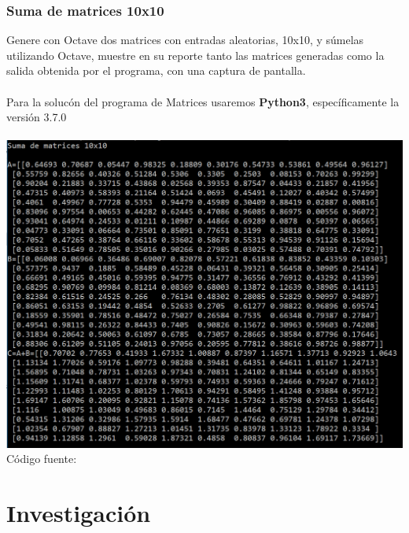 \documentclass[12pt, letterpaper]{article}
\begin{document}
\subsubsection{Suma de matrices 10x10}
Genere con Octave dos matrices con entradas aleatorias, 10x10, y s\'umelas utilizando Octave, muestre en su reporte tanto las matrices generadas como la salida obtenida por el programa, con una captura de pantalla. \\ \\
Para la soluc\'on del programa de Matrices usaremos \textbf{Python3}, específicamente la versi\'on 3.7.0 \\\\
\includegraphics[scale=0.7]{matrices} \\

C\'odigo fuente:\\



\section{Investigaci\'on}
\end{document}
